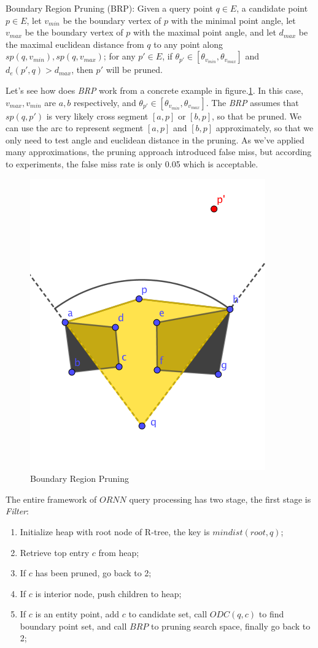 \begin{definition}{Boundary Region Pruning (BRP):}
  Given a query point $q \in E$, a candidate point $p \in E$, let $v_{min}$ be the boundary
  vertex of $p$ with the minimal point angle, let $v_{max}$ be the boundary vertex of $p$
  with the maximal point angle, and let $d_{max}$ be the maximal euclidean distance from $q$ to any
  point along $sp(q, v_{min}), sp(q, v_{max})$; for any $p' \in E$, if
  $\theta_{p'} \in [\theta_{v_{min}}, \theta_{v_{max}}]$ and $d_e(p', q) > d_{max}$, then
  $p'$ will be pruned.
\end{definition}

Let's see how does \textit{BRP} work from a concrete example in figure.\ref{bp}. In this case,
$v_{max}, v_{min}$ are $a, b$ respectively, and $\theta_{p'} \in [\theta_{v_{min}},
\theta_{v_{max}}]$. The \textit{BRP} assumes that $sp(q, p')$ is very likely cross segment
$[a, p]$ or $[b, p]$, so that be pruned. We can use the arc to represent segment $[a, p]$ and $[b, p]$ approximately,
so that we only need to test angle and euclidean distance in the pruning. As we've applied many
approximations, the pruning approach introduced false miss, but according to experiments, the
false miss rate is only 0.05 which is acceptable.

\begin{figure}[htp]
  \centering
  \includegraphics[width=.4\linewidth]{pic/bp.png}
  \caption{Boundary Region Pruning}
  \label{bp}
\end{figure}

The entire framework of $ORNN$ query processing has two stage,
the first stage is \textit{Filter}:
\begin{enumerate}
  \item Initialize heap with root node of R-tree, the key is $mindist(root, q)$;
  \item Retrieve top entry $c$ from heap;
  \item If $c$ has been pruned, go back to 2;
  \item If $c$ is interior node, push children to heap;
  \item If $c$ is an entity point, add $c$ to candidate set, call $ODC(q, c)$ to find boundary
    point set, and call $BRP$ to pruning search space, finally go back to 2;
\end{enumerate}

